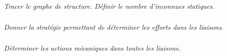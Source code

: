 \documentclass[10pt,fleqn]{article} %
\begin{document}
\begin{multicols}{2}
\subparagraph{}\textit{Tracer le graphe de structure. Définir le nombre d'inconnues statiques.}

\subparagraph{}\textit{Donner la stratégie permettant de déterminer les efforts dans les liaisons.}

\subparagraph{}\textit{Déterminer les actions mécaniques dans toutes les liaisons.}



\ifprof
\else
\end{multicols}
\fi

\end{document}
